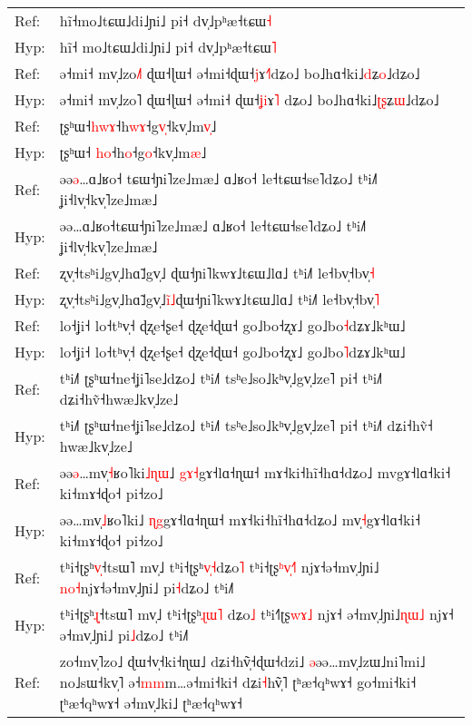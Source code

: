 \documentclass[10pt]{article}
\DeclareRobustCommand{\hl}[1]{{\textcolor{red}{#1}}}
\begin{document}
\begin{longtable}{ll}
\midrule 
Ref: & hĩ˧mo˩tɕɯ˩di˩ɲi˩ pi˧ dv̩˩pʰæ˧tɕɯ\hl{˧} \\ 
Hyp: & hĩ˧\hl{ }mo˩tɕɯ˩di˩ɲi˩ pi˧ dv̩˩pʰæ˧tɕɯ\hl{˥} \\ 
\midrule 
Ref: & ə˧mi˧ mv̩˩zo\hl{˩}˥ ɖɯ˧ɭɯ˧ ə˧mi˧ɖɯ˧\hl{j}ɤ\hl{˧}\hl{˥}dʑo˩ bo˩hɑ˧ki˩\hl{d}ʑ\hl{o}˩dʑo˩ \\ 
Hyp: & ə˧mi˧ mv̩˩zo˥ ɖɯ˧ɭɯ˧ ə˧mi˧\hl{ }ɖɯ˧\hl{ʝ}\hl{i}ɤ\hl{˥}\hl{ }dʑo˩ bo˩hɑ˧ki˩\hl{ʈ}\hl{ʂ}ʑ\hl{ɯ}˩dʑo˩ \\ 
\midrule 
Ref: & ʈʂʰɯ˧\hl{h}\hl{w}\hl{ɤ}˧h\hl{w}\hl{ɤ}˧g\hl{v}\hl{̩}˧kv̩˩m\hl{v}\hl{̩}˩ \\ 
Hyp: & ʈʂʰɯ˧\hl{ }\hl{h}\hl{o}˧h\hl{o}˧g\hl{o}˧kv̩˩m\hl{æ}˩ \\ 
\midrule 
Ref: & əə\hl{ə}…ɑ˩ʁo˧\hl{ }tɕɯ˧ɲi˥ze˩mæ˩ ɑ˩ʁo˧ le˧tɕɯ˧se˥dʑo˩ tʰi˩˥ ʝi˧lv̩˧kv̩˥ze˩mæ˩ \\ 
Hyp: & əə…ɑ˩ʁo˧tɕɯ˧ɲi˥ze˩mæ˩ ɑ˩ʁo˧ le˧tɕɯ˧se˥dʑo˩ tʰi˩˥ ʝi˧lv̩˧kv̩˥ze˩mæ˩ \\ 
\midrule 
Ref: & ʐv̩˧tsʰi˩gv̩˩hɑ̃˩gv̩˩\hl{ }ɖɯ˧ɲi˥kwɤ˩tɕɯ˩lɑ˩ tʰi˩˥ le˧bv̩˧bv̩\hl{˧} \\ 
Hyp: & ʐv̩˧tsʰi˩gv̩˩hɑ̃˩gv̩˩\hl{i}\hl{̃}\hl{˩}ɖɯ˧ɲi˥kwɤ˩tɕɯ˩lɑ˩ tʰi˩˥ le˧bv̩˧bv̩\hl{˥} \\ 
\midrule 
Ref: & lo˧ʝi˧ lo˧tʰv̩˧ ɖʐe˧ʂe˧ ɖʐe˧ɖɯ˧ go˩bo˧ʐɤ˩ go˩bo\hl{˧}dʑɤ˩kʰɯ˩ \\ 
Hyp: & lo˧ʝi˧ lo˧tʰv̩˧ ɖʐe˧ʂe˧ ɖʐe˧ɖɯ˧ go˩bo˧ʐɤ˩ go˩bo\hl{˥}dʑɤ˩kʰɯ˩ \\ 
\midrule 
Ref: & tʰi˩˥ ʈʂʰɯ˧ne˧ʝi˥se˩dʑo˩ tʰi˩˥ tsʰe˩so˩kʰv̩˩gv̩˩ze˥ pi˧ tʰi˩˥ dʑi˧hṽ˧hwæ˩kv̩˩ze˩ \\ 
Hyp: & tʰi˩˥ ʈʂʰɯ˧ne˧ʝi˥se˩dʑo˩ tʰi˩˥ tsʰe˩so˩kʰv̩˩gv̩˩ze˥ pi˧ tʰi˩˥ dʑi˧hṽ˧\hl{ }hwæ˩kv̩˩ze˩ \\ 
\midrule 
Ref: & əə\hl{ə}…mv̩\hl{˧}ʁo˥ki\hl{˩}\hl{ɳ}\hl{ɯ}˩ \hl{g}\hl{ɤ}\hl{˧}gɤ˧lɑ˧ɳɯ˧ mɤ˧ki˧hĩ˧hɑ˧dʑo˩ mvgɤ˧lɑ˧ki˧ ki˧mɤ˧ɖo˧ pi˧zo˩ \\ 
Hyp: & əə…mv̩\hl{˩}ʁo˥ki˩ \hl{ɳ}\hl{g}gɤ˧lɑ˧ɳɯ˧ mɤ˧ki˧hĩ˧hɑ˧dʑo˩ mv\hl{̩}\hl{˧}gɤ˧lɑ˧ki˧ ki˧mɤ˧ɖo˧ pi˧zo˩ \\ 
\midrule 
Ref: & tʰi˧ʈʂʰ\hl{v}̩˧tsɯ˥ mv̩˩ tʰi˧ʈʂʰ\hl{v}\hl{̩}\hl{˧}dʑo\hl{˥} tʰi˧ʈʂ\hl{ʰ}\hl{v}\hl{̩}\hl{˧}\hl{˥} njɤ˧ə˧mv̩˩ɲi˩\hl{ }\hl{n}\hl{o}\hl{˧}njɤ˧ə˧mv̩˩ɲi˩ pi\hl{˧}dʑo˩ tʰi˩˥ \\ 
Hyp: & tʰi˧ʈʂʰ\hl{ɻ}̩˧tsɯ˥ mv̩˩ tʰi˧ʈʂʰ\hl{ɻ}\hl{ɯ}\hl{˥}\hl{ }dʑo\hl{˩} tʰi˧\hl{˥}ʈʂ\hl{w}\hl{ɤ}\hl{˩} njɤ˧\hl{ }ə˧mv̩˩ɲi˩\hl{ɳ}\hl{ɯ}\hl{˩}\hl{ }njɤ˧\hl{ }ə˧mv̩˩ɲi˩ pi\hl{˩}dʑo˩ tʰi˩˥ \\ 
\midrule 
Ref: & zo˧mv̩˥zo˩ ɖɯ˧v̩˧ki˧ɳɯ˩ dʑi˧hṽ̩˧ɖɯ˧dzi˩ \hl{ə}əə…mv̩˩zɯ˩ni˥mi˩ no˩sɯ˧kv̩˥ ə˧\hl{m}\hl{m}m…ə˧mi˧ki˧ dʑi\hl{˧}hṽ̩˥ ʈʰæ˧qʰwɤ˧ go˧mi˧ki˧ ʈʰæ˧qʰwɤ˧ ə˧mv̩˩ki˩ ʈʰæ˧qʰwɤ˧ \\ 

\end{longtable}
\end{document}
